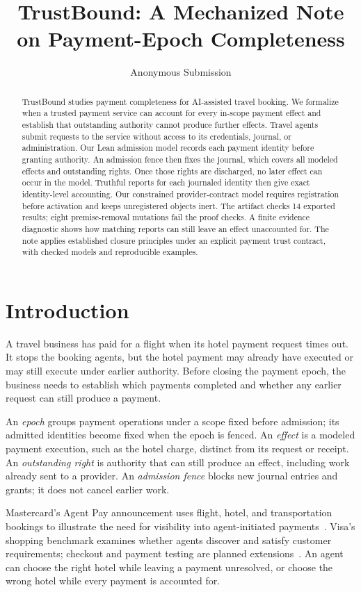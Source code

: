 \documentclass[letterpaper]{article}
\title{TrustBound: A Mechanized Note on Payment-Epoch Completeness}
\author{Anonymous Submission}
\begin{document}
\maketitle
\begin{abstract}
TrustBound studies payment completeness for AI-assisted travel booking. We
formalize when a trusted payment service can account for every in-scope payment
effect and establish that outstanding authority cannot produce further effects.
Travel agents submit requests to the service without access to its credentials,
journal, or administration.
Our Lean admission model records each payment identity before granting
authority. An admission fence then fixes the journal, which covers all modeled
effects and outstanding rights. Once those rights are discharged, no later
effect can occur in the model. Truthful reports for each journaled identity
then give exact identity-level accounting. Our constrained provider-contract
model requires registration before activation and keeps unregistered objects
inert. The artifact checks 14 exported results; eight premise-removal mutations
fail the proof checks. A finite evidence diagnostic shows how matching reports
can still leave an effect unaccounted for. The note applies established closure
principles under an explicit payment trust contract, with checked models and
reproducible examples.
\end{abstract}

\section{Introduction}
A travel business has paid for a flight when its hotel payment request times
out. It stops the booking agents, but the hotel payment may already have
executed or may still execute under earlier authority. Before closing the
payment epoch, the business needs to establish which payments completed and
whether any earlier request can still produce a payment.

An \emph{epoch} groups payment operations under a scope fixed before admission;
its admitted identities become fixed when the epoch is fenced. An \emph{effect}
is a modeled payment execution, such as the hotel charge, distinct from its
request or receipt. An \emph{outstanding right} is authority that can still
produce an effect, including work already sent to a provider. An \emph{admission
fence} blocks new journal entries and grants; it does not cancel earlier work.

Mastercard's Agent Pay announcement uses flight, hotel, and transportation
bookings to illustrate the need for visibility into agent-initiated
payments~\citep{mastercard2026}. Visa's shopping benchmark examines whether
agents discover and satisfy customer requirements; checkout and payment testing
are planned extensions~\citep{visa2026}. An agent can choose the right hotel
while leaving a payment unresolved, or choose the wrong hotel while every
payment is accounted for.
\end{document}
